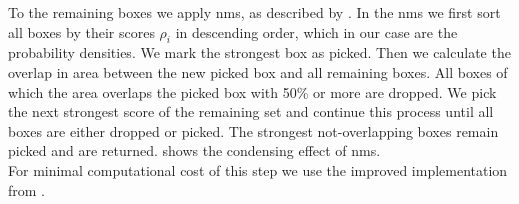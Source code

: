 To the remaining boxes we apply \gls{nms}, as described by \citet{felzenszwalb_discriminatively_2008}. In the \gls{nms} we first sort all boxes by their scores $\rho_i$ in descending order, which in our case are the probability densities. We mark the strongest box as picked. Then we calculate the overlap in area between the new picked box and all remaining boxes. All boxes of which the area overlaps the picked box with 50\% or more are dropped. We pick the next strongest score of the remaining set and continue this process until all boxes are either dropped or picked. The strongest not-overlapping boxes remain picked and are returned.  shows the condensing effect of \gls{nms}.\\For minimal computational cost of this step we use the improved implementation from \citet{malisiewicz_ensemble_2011}.

